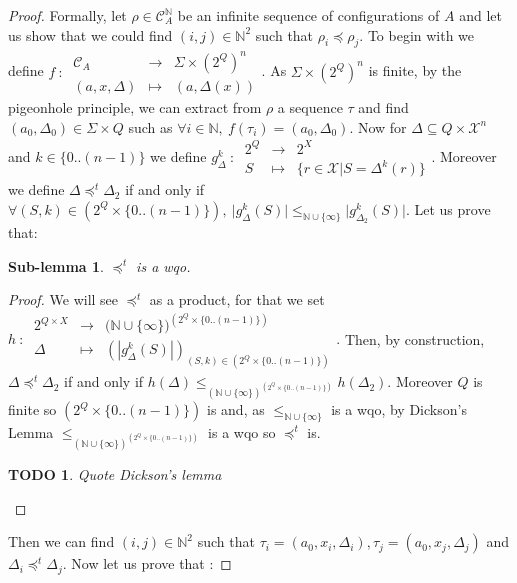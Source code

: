 \documentclass[a4paper,10pt]{report}
\newtheorem{slm}{Sub-lemma}[lm]
\newtheorem{td}{TODO}
\theoremstyle{remark}
\newcommand{\dmap}[5]{
#1~:~\begin{array}{ccccc}
#2 &\to& #3 \\
#4  &\mapsto& #5
\end{array}}
\newcommand{\seg}[1]{\{#1\}}
\newcommand{\ts}{\seg{0 .. (n-1)}}
\newcommand{\C}{\mathcal{C}_{A}}
\newcommand{\Xa}{\mathcal{X}}
\newcommand{\X}{\mathcal{X}^{n}}
\begin{document}
\begin {proof}
Formally, let $\rho \in \C^{\mathbb N}$ be an infinite sequence of configurations of $A$ and let us show that we could find $(i,j) \in \mathbb{N}^2$ such that $\rho_i \preceq \rho_j$.
To begin with we define
$\dmap{f}{\C}{\Sigma \times {(2^Q)}^n}{(a,x,\Delta)}{(a,\Delta(x))}$.
As $\Sigma \times {(2^Q)}^n$ is finite, by the pigeonhole principle, we can extract from $\rho$ a sequence $\tau$ and find $(a_0,\Delta_0) \in \Sigma \times Q$ such as 
$\forall i \in \mathbb N,\ f(\tau_i)=(a_0,\Delta_0)$.
Now for $\Delta \subseteq Q \times \X $ and $k \in \ts$ we define $\dmap{g^k_\Delta}{2^Q}{2^X}{S}{\{ r\in \Xa | S=\Delta^k(r) \}} .$
Moreover we define $\Delta \preceq^t \Delta_2$ if and only if $\forall (S,k) \in (2^Q \times \ts) ,\ \lvert g^k_\Delta(S) \lvert \leq_{\mathbb N \cup \{\infty\}} \lvert g^k_{\Delta_2}(S) \lvert$. Let us prove that: 
\begin{slm}
  $\preceq^t$ is a wqo.
\end{slm}
\begin{proof}
We will see $\preceq^t$ as a product, for that we set $ \dmap{h}{2^{Q\times X}}{({\mathbb N \cup \{\infty\})}^{(2^Q \times \ts)}}{\Delta}{(|g^k_{\Delta}(S)|)_{(S,k)\in (2^Q \times \ts)  }}.$
Then, by construction, $\Delta \preceq^t \Delta_2$ if and only if $ h(\Delta) \leq_{{(\mathbb N \cup \{\infty\})}^{(2^Q \times \ts)}} h(\Delta_2)$.
Moreover $Q$ is finite so $(2^Q \times \ts)$ is and, as $\leq_{\mathbb N \cup \{\infty\}}$ is a wqo, by Dickson's Lemma $\leq_{{(\mathbb N \cup \{\infty\})}^{(2^Q \times \ts)}}$
is a wqo so $\preceq^t$ is.
\begin{td}
  Quote Dickson's lemma
\end{td}
\end{proof}
Then we can find $(i,j)\in \mathbb{N}^2$ such that $\tau_i=(a_0,x_i,\Delta_i), \tau_j=(a_0,x_j,\Delta_j)$ and $\Delta_i \preceq^t \Delta_j$.
Now let us prove that :


\end{proof}
\end{document}
